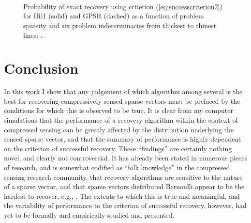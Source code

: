 \documentclass[11pt,draftcls,onecolumn]{IEEEtran}
\begin{document}
\begin{figure}[htb]
\centering
{}\hspace{-0.1in}
\\ \vspace{-0.1in}

\hspace{-0.1in}
\\ \vspace{-0.1in}

\hspace{-0.1in}
\\ \vspace{-0.1in}

\caption{Probability of exact recovery using criterion (\ref{eq:successcriterion2}) 
for IRl1 (solid) and GPSR (dashed) as a function of problem sparsity
and six problem indeterminacies from thickest to thinest lines: 
.}
\label{fig:RecoveryProbabilitiesIRl1GPSR}
\end{figure}

\clearpage











\section{Conclusion}
In this work I show that any judgement of which algorithm among several
is the best for recovering compressively sensed sparse vectors
must be prefaced by the conditions for which this is observed to be true.
It is clear from my computer simulations
that the performance of a recovery algorithm 
within the context of compressed sensing can be
greatly affected by the distribution underlying the sensed sparse vector,
and that the summary of performance is highly dependent on
the criterion of successful recovery.
These ``findings'' are certainly nothing novel,
and clearly not controversial.
It has already been stated in numerous pieces of research,
and is somewhat codified as ``folk knowledge'' in the 
compressed sensing research community,
that recovery algorithms are sensitive to the nature of a sparse vector,
and that sparse vectors distributed Bernoulli
appear to be the hardest to recover, e.g., \cite{Jin2008, Tropp2004,Dai2009,Donoho2009,Maleki2010,Qui2010}.
The extents to which this is true and meaningful,
and the variability of performance to the criterion
of successful recovery, however,
had yet to be formally and empirically studied and presented.
\end{document}
